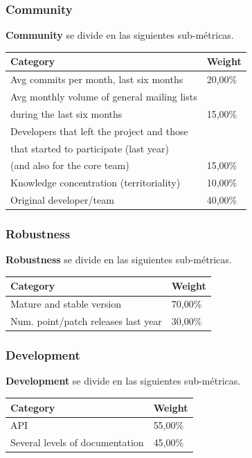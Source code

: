 \documentclass[xcolor=dvipsnames]{beamer}
\begin{document}
\begin{frame}[allowframebreaks]
\frametitle{Community}

\par \textbf{Community} se divide en las siguientes sub-m\'etricas.

\begin{tabular}{|l|l|}
    \hline {\bf Category} & {\bf Weight}\\
    \hline Avg commits per month, last six months	 & 20,00\%\\
    \hline Avg monthly volume of general mailing lists \\during the last six months & 15,00\%\\
    \hline Developers that left the project and those\\ that started to participate (last year)\\ (and also for the  core team) & 15,00\%\\
    \hline Knowledge concentration (territoriality) & 10,00\%\\
    \hline Original developer/team & 40,00\%\\
    \hline
\end{tabular}

\end{frame}

\begin{frame}[allowframebreaks]
\frametitle{Robustness}

\par \textbf{Robustness} se divide en las siguientes sub-m\'etricas.

\begin{tabular}{|l|l|}
    \hline {\bf Category} & {\bf Weight}\\
    \hline Mature and stable version & 70,00\%\\
    \hline Num. point/patch releases last year & 30,00\%\\
    \hline
\end{tabular}

\end{frame}

\begin{frame}[allowframebreaks]
\frametitle{Development}

\par \textbf{Development} se divide en las siguientes sub-m\'etricas.

\begin{tabular}{|l|l|}
    \hline {\bf Category} & {\bf Weight}\\
    \hline API	 & 55,00\%\\
    \hline Several levels of documentation & 45,00\%\\
    \hline
\end{tabular}

\end{frame}
\end{document}
